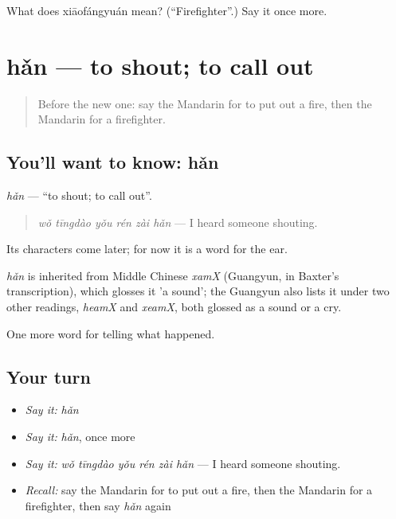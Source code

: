 \begin{tcolorbox}[breakable,colback=teal!4,colframe=teal!35!black,title={Before you move on}]
What does xiāofángyuán mean? (\textquotedblleft{}Firefighter\textquotedblright{}.) Say it once more.
\end{tcolorbox}
\section[hǎn]{hǎn — to shout; to call out}

\label{lesson:ZH-C298-han}



\begin{quote}
Before the new one: say the Mandarin for to put out a fire, then the Mandarin for a firefighter.
\end{quote}

\subsection*{You'll want to know: hǎn}
\emph{hǎn} — \textquotedblleft{}to shout; to call out\textquotedblright{}.

\begin{quote}
\emph{wǒ tīngdào yǒu rén zài hǎn} — I heard someone shouting.
\end{quote}

Its characters come later; for now it is a word for the ear.

\begin{cousinweb}
\emph{hǎn} is inherited from Middle Chinese \emph{xamX} (Guangyun, in Baxter's transcription), which glosses it 'a sound'; the Guangyun also lists it under two other readings, \emph{heamX} and \emph{xeamX}, both glossed as a sound or a cry.
\end{cousinweb}

\begin{grammarlens}[title={What you've built}]
One more word for telling what happened.
\end{grammarlens}

\subsection*{Your turn}
\begin{itemize}
\raggedright
  \item \emph{Say it:} \emph{hǎn}
  \item \emph{Say it:} \emph{hǎn}, once more
  \item \emph{Say it:} \emph{wǒ tīngdào yǒu rén zài hǎn} — I heard someone shouting.
  \item \emph{Recall:} say the Mandarin for to put out a fire, then the Mandarin for a firefighter, then say \emph{hǎn} again
\end{itemize}

